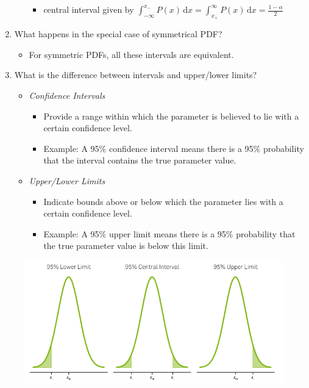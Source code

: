 \documentclass{article}
\begin{document}
\begin{enumerate}
\begin{itemize}
\begin{itemize}
            \item central interval given by 
            $\int_{-\infty}^{x_-}P(x)\,\text{d}x=\int_{x_+}^{\infty}P(x)\,\text{d}x =\frac{1-\alpha}{2}$
        \end{itemize}
    \end{itemize}
    \item What happens in the special case of symmetrical PDF?
    \begin{itemize}
        \item For symmetric PDFs, all these intervals are equivalent.
    \end{itemize}
    \item What is the difference between intervals and upper/lower limits?
    \begin{itemize}
        \item \textit{Confidence Intervals}
        \begin{itemize}
            \item Provide a range within which the parameter is believed to lie with a certain confidence level.
            \item Example: A 95\% confidence interval means there is a 95\% probability that the interval contains the true parameter value.
        \end{itemize}
        \item \textit{Upper/Lower Limits}
        \begin{itemize}
            \item Indicate bounds above or below which the parameter lies with a certain confidence level.
            \item Example: A 95\% upper limit means there is a 95\% probability that the true parameter value is below this limit.
        \end{itemize}
    \end{itemize}
\end{enumerate}

\begin{figure}
    \centering
    \includegraphics[width=\textwidth]{plot.png}
    \label{fig:plot}
\end{figure}
\end{document}
